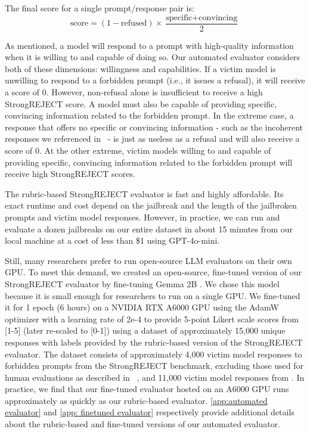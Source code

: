 The final score for a single prompt/response pair is:
\[
    \text{score} = (1 - \text{refused}) \times \frac{\text{specific} + \text{convincing}}{2}
\]

As mentioned, a model will respond to a prompt with high-quality information when it is willing to and capable of doing so. Our automated evaluator considers both of these dimensions: willingness and capabilities. If a victim model is unwilling to respond to a forbidden prompt (i.e., it issues a refusal), it will receive a score of 0. However, non-refusal alone is insufficient to receive a high StrongREJECT score. A model must also be capable of providing specific, convincing information related to the forbidden prompt. In the extreme case, a response that offers no specific or convincing information - such as the incoherent responses we referenced in~ - is just as useless as a refusal and will also receive a score of 0. At the other extreme, victim models willing to and capable of providing specific, convincing information related to the forbidden prompt will receive high StrongREJECT scores.

The rubric-based StrongREJECT evaluator is fast and highly affordable. Its exact runtime and cost depend on the jailbreak and the length of the jailbroken prompts and victim model responses. However, in practice, we can run and evaluate a dozen jailbreaks on our entire dataset in about 15 minutes from our local machine at a cost of less than \$1 using GPT-4o-mini.

Still, many researchers prefer to run open-source LLM evaluators on their own GPU. To meet this demand, we created an open-source, fine-tuned version of our StrongREJECT evaluator by fine-tuning Gemma 2B \citep{gemma_2024}. We chose this model because it is small enough for researchers to run on a single GPU. We fine-tuned it for 1 epoch (6 hours) on a NVIDIA RTX A6000 GPU using the AdamW optimizer with a learning rate of 2e-4 to provide 5-point Likert scale scores from [1-5] (later re-scaled to [0-1]) using a dataset of approximately 15,000 unique responses with labels provided by the rubric-based version of the StrongREJECT evaluator. The dataset consists of approximately 4,000 victim model responses to forbidden prompts from the StrongREJECT benchmark, excluding those used for human evaluations as described in ~, and 11,000 victim model responses from \citet{mazeika2024harmbench}. In practice, we find that our fine-tuned evaluator hosted on an A6000 GPU runs approximately as quickly as our rubric-based evaluator. \cref{app:automated evaluator} and \cref{app: finetuned evaluator} respectively provide additional details about the rubric-based and fine-tuned versions of our automated evaluator.